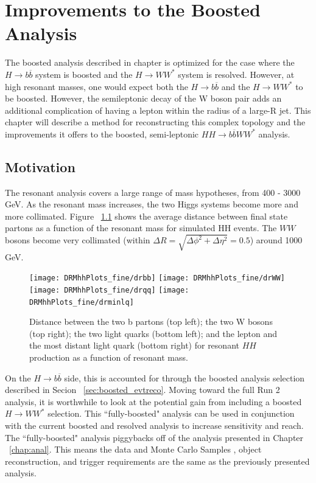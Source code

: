 \chapter{Improvements to the Boosted Analysis}
\label{chap:fully}
The boosted analysis described in chapter \cite{chap:anal} is optimized for the case where the ${H\rightarrow b\overline{b}}$ system is boosted and the ${H\rightarrow WW^{*}}$ system is resolved. However, at high resonant masses, one would expect both the ${H\rightarrow b\overline{b}}$ and the ${H\rightarrow WW^{*}}$ to be boosted. However, the semileptonic decay of the W boson pair adds an additional complication of having a lepton within the radius of a large-R jet. This chapter will describe a method for reconstructing this complex topology and the improvements it offers to the boosted, semi-leptonic ${HH\rightarrow b\overline{b}WW^{*}}$ analysis.
\section{Motivation}
The resonant analysis covers a large range of mass hypotheses, from 400 - 3000 GeV. As the resonant mass increases, the two Higgs systems become more and more collimated. Figure ~\ref{fig:dr} shows the average distance between final state partons as a function of the resonant mass for simulated HH events. The $WW$ bosons become very collimated (within ${\Delta{R} = \sqrt{\Delta{\phi}^{2}+\Delta{\eta}^{2}} = 0.5}$) around 1000 GeV. \newline
\begin{figure}[h]
\begin{center}
\texttt{[image: DRMhhPlots\_fine/drbb]}
\texttt{[image: DRMhhPlots\_fine/drWW]}
\\
\texttt{[image: DRMhhPlots\_fine/drqq]}
\texttt{[image: DRMhhPlots\_fine/drminlq]}

\caption[Distance between parton objects]{Distance between the two b partons (top left); the two W bosons (top right); the two light quarks (bottom left); and the lepton and the most distant light quark (bottom right) for resonant $HH$ production as a function of resonant mass.}
\label{fig:dr}
\end{center}
\end{figure}
\indent On the ${H\rightarrow b\overline{b}}$ side, this is accounted for through the boosted analysis selection described in Secion ~\ref{sec:boosted_evtreco}. Moving toward the full Run 2 analysis, it is worthwhile to look at the potential gain from including a boosted ${H\rightarrow WW^{*}}$ selection. This ``fully-boosted" analysis can be used in conjunction with the current boosted and resolved analysis to increase sensitivity and reach.\newline
\indent The ``fully-boosted" analysis piggybacks off of the analysis presented in Chapter ~\ref{chap:anal}. This means the data and Monte Carlo Samples , object reconstruction, and trigger requirements are the same as the previously presented analysis. \newline
